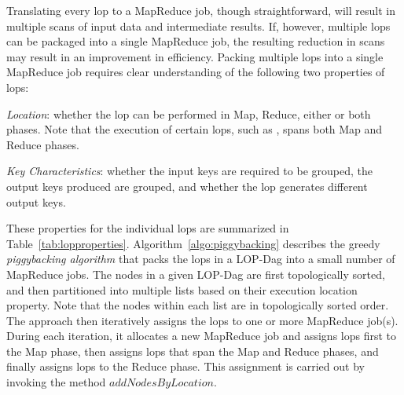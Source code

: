 Translating every lop to a MapReduce job, though straightforward, will result in multiple 
scans of input data and intermediate results. If, however, multiple lops can be packaged 
into a single MapReduce job, the resulting reduction in scans may result in an improvement 
in efficiency. Packing multiple lops into a single MapReduce job requires clear 
understanding of the following two properties of lops:

\emph{Location}: whether the lop can be performed in Map, Reduce, either or both phases. 
Note that the execution of certain lops, such as \grplop, spans both Map and Reduce 
phases.

\emph{Key Characteristics}: whether the input keys are required to be grouped, the output 
keys produced are grouped, and whether the lop generates different output keys. 

These properties for the individual lops are summarized in Table~\ref{tab:lopproperties}. Algorithm~\ref{algo:piggybacking} describes the greedy {\it piggybacking algorithm} that packs the lops in a LOP-Dag into a small number of MapReduce jobs. The nodes in a given LOP-Dag are first topologically sorted, and then partitioned into multiple lists based on their execution location property. Note that the nodes within each list are in topologically sorted order. The approach then iteratively assigns the lops to one or more MapReduce job(s). During each iteration, it allocates a new MapReduce job and assigns lops first to the Map phase, then assigns lops that span the Map and Reduce phases, and finally assigns lops to the Reduce phase. This assignment is carried out by invoking the method $addNodesByLocation$. 


